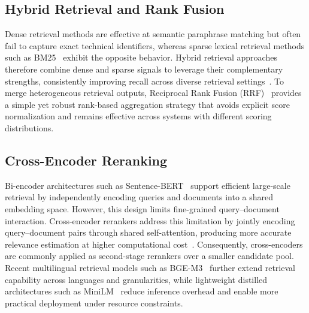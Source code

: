 \documentclass[runningheads]{llncs}
\begin{document}
\subsection{Hybrid Retrieval and Rank Fusion}

Dense retrieval methods are effective at semantic paraphrase matching but often fail to capture exact technical identifiers, whereas sparse lexical retrieval methods such as BM25~\cite{robertson2009bm25} exhibit the opposite behavior. Hybrid retrieval approaches therefore combine dense and sparse signals to leverage their complementary strengths, consistently improving recall across diverse retrieval settings~\cite{ma2021dense}. To merge heterogeneous retrieval outputs, Reciprocal Rank Fusion (RRF)~\cite{cormack2009rrf} provides a simple yet robust rank-based aggregation strategy that avoids explicit score normalization and remains effective across systems with different scoring distributions.

\subsection{Cross-Encoder Reranking}

Bi-encoder architectures such as Sentence-BERT~\cite{reimers2019sbert} support efficient large-scale retrieval by independently encoding queries and documents into a shared embedding space. However, this design limits fine-grained query--document interaction. Cross-encoder rerankers address this limitation by jointly encoding query--document pairs through shared self-attention, producing more accurate relevance estimation at higher computational cost~\cite{nogueira2019passage}. Consequently, cross-encoders are commonly applied as second-stage rerankers over a smaller candidate pool. Recent multilingual retrieval models such as BGE-M3~\cite{bgem3} further extend retrieval capability across languages and granularities, while lightweight distilled architectures such as MiniLM~\cite{wang2020minilm} reduce inference overhead and enable more practical deployment under resource constraints.
\end{document}
